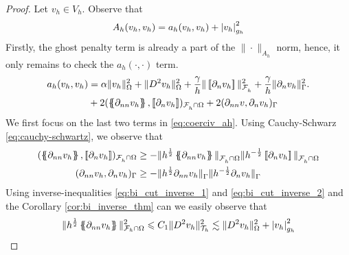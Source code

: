\begin{proof}
    Let $v_{h} \in V_{h}$.
    Observe that
    \begin{equation}
    A_{h}( v_{h},v_{h}) = a_{h}( v_{h},v_{h})  + \left\lvert  v_{h}  \right\rvert_{g_{h}}^{2}
    \end{equation}
    Firstly, the ghost penalty term is already a part of the $\| \cdot  \|_{ A_{h} }^{  } $ norm, hence, it only remains to check the $a_{h}( \cdot ,\cdot ) $ term.
    \begin{equation}
        \label{eq:coerciv_ah}
    \begin{split}
       a_{h}( v_{h},v_{h}) &=   \alpha \| v_{h} \|_{   \Omega   }^{2} + \| D^2v_{h} \|_{   \Omega  }^{2  }  + \frac{\gamma }{h}  \|  \jump{ \partial _{n} v_{h} }\|_{\mathcal{F} _{h}^{}  }^{ 2 } + \frac{\gamma }{h}  \| \partial _{n} v_{h} \|_{ \Gamma  }^{ 2 }. \\
                   & + 2 ( \mean{ \partial _{nn} v_{h} }, \jump{ \partial _{n} v_{h} }    )_{\mathcal{F} ^{}_{h} \cap \Omega }  + 2 (  \partial _{nn} v ,
       \partial _{n} v_{h}  )_{\Gamma } \\
    \end{split}
    \end{equation}
    We first focus on the last two terms in \eqref{eq:coerciv_ah}. Using Cauchy-Schwarz \eqref{eq:cauchy-schwartz}, we observe that
    \begin{equation}
        \begin{split}
    ( \mean{ \partial _{nn} v_{h} }  , \jump{ \partial _{n} v_{h} }  )_{\mathcal{F}^{}_{h}\cap \Omega  } & \ge - \| h^{\frac{1}{2}}\mean{ \partial _{nn} v_{h} }   \|_{ \mathcal{F}^{}_{h}\cap \Omega   }^{  }  \|h^{-\frac{1}{2}} \jump{ \partial _{n} v_{h} }   \|_{
    \mathcal{F}^{}_{h}\cap \Omega   }^{  } \\
    (  \partial _{nn} v_{h}   ,  \partial _{n} v_{h}   )_{\Gamma   } & \ge - \| h^{\frac{1}{2}} \partial _{nn} v_{h}    \|_{ \Gamma    }^{  }  \|h^{-\frac{1}{2}}  \partial _{n} v_{h}    \|_{ \Gamma    }^{  }
        \end{split}
    \end{equation}
    Using inverse-inequalities \eqref{eq:bi_cut_inverse_1} and \eqref{eq:bi_cut_inverse_2} and the Corollary \ref{cor:bi_inverse_thm} can we easily observe that
    \begin{equation}
        \begin{split}
     \| h^{\frac{1}{2}} \mean{ \partial _{nn}v_{h} } \|_{ \mathcal{F}_{h} \cap \Omega    }^{  2} & \le C_{1} \| D^2 v_{h} \|_{ \mathcal{T}_{h}   }^{2  } \lesssim   \| D^2 v_{h} \|_{ \Omega  }^{ 2 }  + \abs{ v_{h} } _{ g_{h} }^{2  }   \\

\end{split}
\end{equation}
\end{proof}
